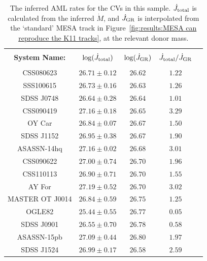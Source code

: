 \begin{table}
    \centering
    \caption{The inferred AML rates for the CVs in this sample. $\dot J_{\rm total}$ is calculated from the inferred $\dot M$, and $\dot J_{\rm GR}$ is interpolated from the `standard' MESA track in Figure~\ref{fig:results:MESA can reproduce the K11 tracks}, at the relevant donor mass.}
    \label{table:results:Jdot results}
    \begin{tabular}{ccccc}
        \hline \\
        {\bf System Name:}  & \textbf{$\log(\dot J_{\rm total})$} & \textbf{$\log(\dot J_{\rm GR})$} & \textbf{$\dot J_{\rm total} / \dot J_{\rm GR}$} \\
        \hline \hline \\
        CSS080623           & $26.71 \pm 0.12$  &  $26.62$  &  $1.22$ \\
        SSS100615           & $26.73 \pm 0.16$  &  $26.63$  &  $1.26$ \\
        SDSS J0748          & $26.64 \pm 0.28$  &  $26.64$  &  $1.01$ \\
        CSS090419           & $27.16 \pm 0.18$  &  $26.65$  &  $3.29$ \\
        OY Car              & $26.84 \pm 0.07$  &  $26.67$  &  $1.50$ \\
        SDSS J1152          & $26.95 \pm 0.38$  &  $26.67$  &  $1.90$ \\
        ASASSN-14hq         & $27.16 \pm 0.02$  &  $26.68$  &  $3.01$ \\
        CSS090622           & $27.00 \pm 0.74$  &  $26.70$  &  $1.96$ \\
        CSS110113           & $26.90 \pm 0.71$  &  $26.70$  &  $1.55$ \\
        AY For              & $27.19 \pm 0.52$  &  $26.70$  &  $3.02$ \\
        MASTER OT J0014     & $26.84 \pm 0.59$  &  $26.75$  &  $1.25$ \\
        OGLE82              & $25.44 \pm 0.55$  &  $26.77$  &  $0.05$ \\
        SDSS J0901          & $26.55 \pm 0.70$  &  $26.78$  &  $0.58$ \\
        ASASSN-15pb         & $27.09 \pm 0.44$  &  $26.80$  &  $1.97$ \\
        SDSS J1524          & $26.99 \pm 0.17$  &  $26.58$  &  $2.59$ \\
        \hline
    \end{tabular}
\end{table}


